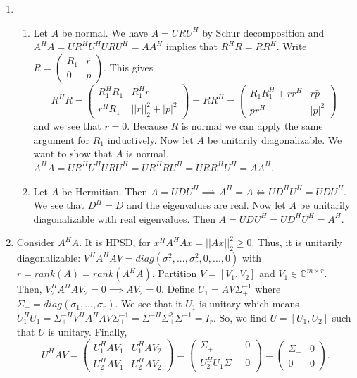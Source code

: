\documentclass[a4paper, landscape,twocolumn,fontsize=9pt]{scrartcl}
\begin{document}
\begin{enumerate}
    \item 
    \begin{enumerate}
	    \item Let $A$ be normal. We have $A = URU^H$ by Schur decomposition and $A^HA = UR^HU^HURU^H = AA^H$ implies that $R^HR = RR^H$. Write $R = \begin{pmatrix}
	    	R_1 & r \\ 0 & p
	    \end{pmatrix}$. This gives
	    \[
	    	R^HR = \begin{pmatrix}
	    		R_1^HR_1 & R_1^Hr \\
	    		r^HR_1 & ||r||^2_2 + |p|^2
	    	\end{pmatrix} = RR^H = \begin{pmatrix}
	    		R_1R_1^H + rr^H & r \bar p \\
	    		p r^H & |p|^2
	    	\end{pmatrix}
	    \]
	    and we see that $r = 0$. Because $R$ is normal we can apply the same argument for $R_1$ inductively. Now let $A$ be unitarily diagonalizable. We want to show that $A$ is normal. $A^HA = UR^HU^HURU^{H} = U R^H R U^H = U R R^H U^H = AA^H$.
	    
	    \item Let $A$ be Hermitian. Then $A = UDU^H \implies A^H = A \iff UD^HU^H = UDU^H$. We see that $D^H = D$ and the eigenvalues are real. Now let $A$ be unitarily diagonalizable with real eigenvalues. Then $A = UDU^H = UD^HU^H = A^H$.
    \end{enumerate}
    
    \item Consider $A^HA$. It is HPSD, for $x^HA^HAx = ||Ax||^2_2 \geq 0$. Thus, it is unitarily diagonalizable: $V^H A^HAV = diag(\sigma_1^2,...,\sigma_r^2,0,...,0)$ with \underline{$r = rank(A) = rank(A^HA)$}. Partition $V = [V_1,V_2]$ and $V_1 \in \mathbb C^{m \times r}$. Then, $V_2^HA^HAV_2 = 0 \implies AV_2 = 0$. Define $U_1 = AV\Sigma^{-1}_+$ where $\Sigma_+ = diag(\sigma_1,...,\sigma_r)$. We see that it $U_1$ is unitary which means $U_1^HU_1 = \Sigma_+^{-H}V^HA^HAV\Sigma_+^{-1} = \Sigma^{-H} \Sigma_+^2 \Sigma^{-1} = I_r$. So, we find $U = [U_1,U_2]$ such that $U$ is unitary. Finally, $$U^H A V = \begin{pmatrix}
    		U_1^HAV_1 & U_1^HAV_2 \\ U_2^HAV_1 & U_2^HAV_2
    	\end{pmatrix} = \begin{pmatrix}
    		\Sigma_+ & 0 \\ U_2^HU_1\Sigma_+ & 0
    	\end{pmatrix} = \begin{pmatrix}
    		\Sigma_+ & 0 \\ 0 & 0
    	\end{pmatrix}.$$
\end{enumerate}
\end{document}
